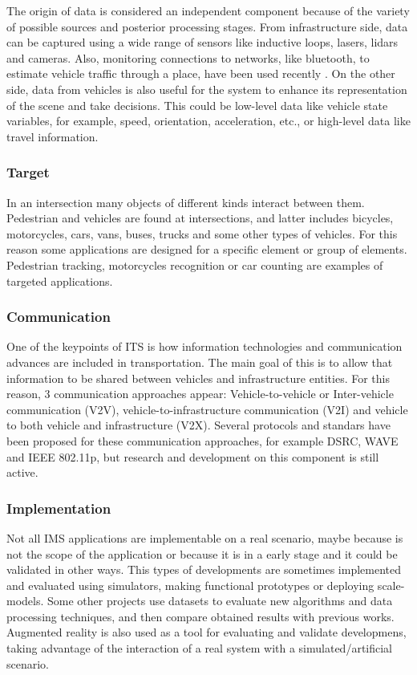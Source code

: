 The origin of data is considered an independent component because of the variety of possible sources and posterior processing stages. From infrastructure side, data can be captured using a wide range of sensors like inductive loops, lasers, lidars and cameras. Also, monitoring connections to networks, like bluetooth, to estimate vehicle traffic through a place, have been used recently \cite{Friesen2013, Friesen2014}. On the other side, data from vehicles is also useful for the system to enhance its representation of the scene and take decisions. This could be low-level data like vehicle state variables, for example, speed, orientation, acceleration, etc., or high-level data like travel information.


\subsubsection{Target}

In an intersection many objects of different kinds interact between them. Pedestrian and vehicles are found at intersections, and latter includes bicycles, motorcycles, cars, vans, buses, trucks and some other types of vehicles. For this reason some applications are designed for a specific element or group of elements. Pedestrian tracking, motorcycles recognition or car counting are examples of targeted applications.

\subsubsection{Communication}

One of the keypoints of ITS is how information technologies and communication advances are included in transportation. The main goal of this is to allow that information to be shared between vehicles and infrastructure entities. For this reason, 3 communication approaches appear: Vehicle-to-vehicle or Inter-vehicle communication (V2V), vehicle-to-infrastructure communication (V2I) and vehicle to both vehicle and infrastructure (V2X). Several protocols and standars have been proposed for these communication approaches, for example DSRC, WAVE and IEEE 802.11p, but research and development on this component is still active.

\subsubsection{Implementation}

Not all IMS applications are implementable on a real scenario, maybe because is not the scope of the application or because it is in a early stage and it could be validated in other ways. This types of developments are sometimes implemented and evaluated using simulators, making functional prototypes or deploying scale-models. Some other projects use datasets to evaluate new algorithms and data processing techniques, and then compare obtained results with previous works. Augmented reality is also used as a tool for evaluating and validate developmens, taking advantage of the interaction of a real system with a simulated/artificial scenario.

